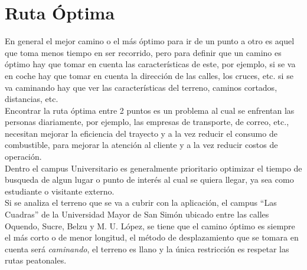 \section{Ruta Óptima} %
\label{cha:ruta_optima}

En general el mejor camino o el más óptimo para ir de un punto a otro es aquel que toma menos tiempo en ser recorrido, pero para definir que un camino es óptimo hay que tomar en cuenta las características de este, por ejemplo, si se va en coche hay que tomar en cuenta la dirección de las calles, los cruces, etc. si se va caminando hay que ver las características del terreno, caminos cortados, distancias, etc.\\


Encontrar la ruta óptima entre 2 puntos es un problema al cual se enfrentan las personas diariamente, por ejemplo, las empresas de transporte, de correo, etc., necesitan mejorar la eficiencia del trayecto y a la vez reducir el consumo de combustible, para mejorar la atención al cliente y a la vez reducir costos de operación. \\

Dentro el campus Universitario es generalmente prioritario optimizar el tiempo de busqueda de algun lugar o punto de interés al cual se quiera llegar, ya sea como estudiante o visitante externo.\\


Si se analiza el terreno que se va a cubrir con la aplicación, el campus ``Las Cuadras'' de la Universidad Mayor de San Simón ubicado entre las calles Oquendo, Sucre,  Belzu y M. U. López, se tiene que el camino óptimo es siempre el más corto o de menor longitud, el método de desplazamiento que se tomara en cuenta será \emph{caminando}, el terreno es llano y la única restricción es respetar las rutas peatonales.\\


